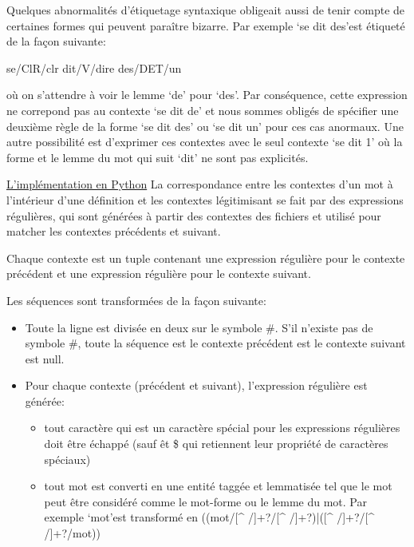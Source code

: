 Quelques abnormalités d'étiquetage syntaxique obligeait aussi de tenir compte de certaines formes qui peuvent paraître bizarre. Par exemple \lq{se dit des}\rq est étiqueté de la façon suivante:

\begin{framed}
se/ClR/clr dit/V/dire des/DET/un
\end{framed}

où on s'attendre à voir le lemme \lq{de}\rq{} pour \lq{des}\rq{}. Par conséquence, cette expression ne correpond pas au contexte \lq{se dit de}\rq{} et nous sommes obligés de spécifier une deuxième règle de la forme \lq{se dit des}\rq{} ou \lq{se dit un}\rq{} pour ces cas anormaux. Une autre possibilité est d'exprimer ces contextes avec le seul contexte \lq{se dit 1}\rq{} où la forme et le lemme du mot qui suit \lq{dit}\rq{} ne sont pas explicités.

\underline{L'implémentation en Python}\newline
La correspondance entre les contextes d'un mot à l'intérieur d'une définition et 
les contextes légitimisant se fait par des expressions régulières, qui sont 
générées à partir des contextes des fichiers et utilisé pour matcher les contextes
précédents et suivant.

Chaque contexte est un tuple contenant une expression régulière pour le contexte 
précédent et une expression régulière pour le contexte suivant.

Les séquences sont transformées de la façon suivante:
\begin{itemize}
    \item{Toute la ligne est divisée en deux sur le symbole \#. S'il n'existe 
    pas de symbole \#, toute la séquence est le contexte précédent est le 
    contexte suivant est null.}
    \item{Pour chaque contexte (précédent et suivant), l'expression régulière 
    est générée:}
    \begin{itemize}
        \item{tout caractère qui est un caractère spécial pour les expressions 
        régulières doit être échappé (sauf \^ et \$ qui retiennent leur 
	propriété de caractères spéciaux)}
        \item{tout mot est converti en une entité taggée et lemmatisée tel que 
        le mot peut être considéré comme le mot-forme ou le lemme du mot. Par 
	exemple \lq{mot}\rq  est transformé en ((mot/[\string^ /]+?/[\string^ 
	/]+?)|([\string^ /]+?/[\string^ /]+?/mot)) }
    \end{itemize}
\end{itemize}

